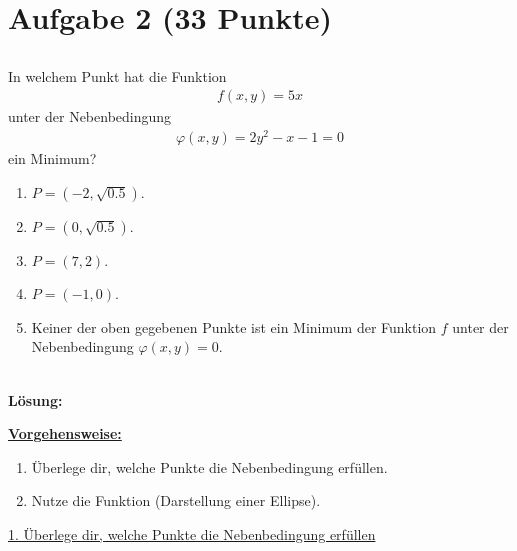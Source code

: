 \section*{Aufgabe 2 (33 Punkte)}
\vspace{0.4cm}
\subsection*{}
In welchem Punkt hat die Funktion
\begin{align*}
	f(x,y) = 5x
\end{align*}
unter der Nebenbedingung
\begin{align*}
	\varphi(x,y) = 2 y^2 - x - 1 = 0
\end{align*}
ein Minimum?
\renewcommand{\labelenumi}{(\alph{enumi})}
\begin{enumerate}
	\item $ P= (-2,\sqrt{0.5}) $.
	\item $ P= (0,\sqrt{0.5}) $.
	\item $ P= (7,2) $.
	\item $ P= (-1,0) $.
	\item Keiner der oben gegebenen Punkte ist ein Minimum der Funktion $ f $ unter der Nebenbedingung $ \varphi(x,y)= 0 $.
\end{enumerate}
\ \\
\textbf{Lösung:}
\begin{mdframed}
\underline{\textbf{Vorgehensweise:}}
\renewcommand{\labelenumi}{\theenumi.}
\begin{enumerate}
\item Überlege dir, welche Punkte die Nebenbedingung erfüllen.
\item Nutze die Funktion (Darstellung einer Ellipse).
\end{enumerate}
\end{mdframed}

\underline{1. Überlege dir, welche Punkte die Nebenbedingung erfüllen}\\


\newpage


